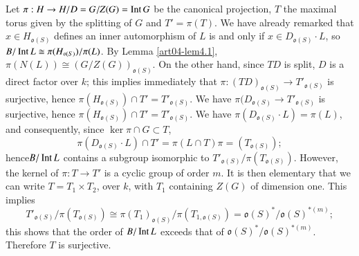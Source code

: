 Let $\pi:H\to H/D=G/Z(G)=\operatorname{\mathrm{Int}} G$ be the canonical projection, $T$ the maximal torus given by the splitting of $G$ and $T'=\pi(T)$. We have already remarked that $x\in H_{\mathfrak{o}(S)}$ defines an inner automorphism of $L$ is and only if $x\in D_{\mathfrak{o}(S)}\cdot L$, so $B/\operatorname{\mathrm{Int}} L\cong \pi(H_{\mathfrak{o}(S)})/\pi(L)$. By Lemma \ref{art04-lem4.1}, $\pi(N(L))\cong (G/Z(G))_{\mathfrak{o}(S)}$. On the other hand, since $TD$ is split, $D$ is a direct factor over $k$; this implies immediately that $\pi:(TD)_{\mathfrak{o}(S)}\to T'_{\mathfrak{o}(S)}$ is surjective, hence $\pi(H_{\mathfrak{o}(S)})\cap T'=T'_{\mathfrak{o}(S)}$. We have $\pi(D_{\mathfrak{o}(S)}\to T'_{\mathfrak{o}(S)}$ is surjective, hence $\pi(H_{\mathfrak{o}(S)})\cap T'=T'_{\mathfrak{o}(S)}$. We have $\pi(D_{\mathfrak{o}(S)}\cdot L)=\pi(L)$, and consequently, since $\ker \pi \cap G\subset T$,
$$
\pi (D_{\mathfrak{o}(S)}\cdot L)\cap T'=\pi(L\cap T)\pi=(T_{\mathfrak{o}(S)});
$$
hence\pageoriginale $B/\operatorname{\mathrm{Int}} L$ contains a subgroup isomorphic to $T'_{\mathfrak{o}(S)}/\pi(T_{\mathfrak{o}(S)})$. However, the kernel of $\pi:T\to T'$ is a cyclic group of order $m$. It is then elementary that we can write $T=T_{1}\times T_{2}$, over $k$, with $T_{1}$ containing $Z(G)$ of dimension one. This implies
$$
T'_{\mathfrak{o}(S)}/\pi(T_{\mathfrak{o}(S)})\cong \pi(T_{1})_{\mathfrak{o}(S)}/\pi(T_{1,\mathfrak{o}(S)})=\mathfrak{o}(S)^{*}/\mathfrak{o}(S)^{*(m)};
$$
this shows that the order of $B/\operatorname{\mathrm{Int}} L$ exceeds that of $\mathfrak{o}(S)^{*}/\mathfrak{o}(S)^{*(m)}$. Therefore $T$ is surjective.

